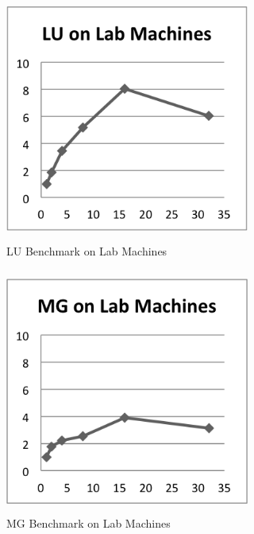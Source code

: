\documentclass{acm_proc_article-sp}
\begin{document}
\begin{figure}[tbp]
  \centering
  \caption{LU Benchmark on Lab Machines}
	\label{LabLU}
  \includegraphics[width=19pc, height=19pc]{Pics-Lab/LU.png}
\end{figure}

\begin{figure}[tbp]
  \centering
  \caption{MG Benchmark on Lab Machines}
	\label{LabMG}
  \includegraphics[width=19pc, height=19pc]{Pics-Lab/MG.png}
\end{figure}
\end{document}
